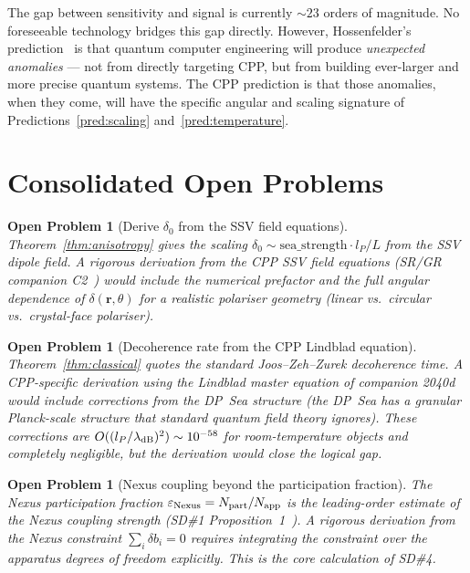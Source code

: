 \documentclass[11pt,a4paper]{article}
\newtheorem{openprob}[theorem]{Open Problem}
\newcommand{\lP}{l_P}
\newcommand{\eps}{\varepsilon}
\begin{document}
The gap between sensitivity and signal is currently $\sim 23$
orders of magnitude.  No foreseeable technology bridges this gap
directly.  However, Hossenfelder's prediction~\citep{hossenfelder2024}
is that quantum computer engineering will produce \emph{unexpected
anomalies} --- not from directly targeting CPP, but from building
ever-larger and more precise quantum systems.  The CPP prediction is
that those anomalies, when they come, will have the specific angular
and scaling signature of Predictions~\ref{pred:scaling}
and~\ref{pred:temperature}.

\section{Consolidated Open Problems}

\begin{openprob}[Derive $\delta_0$ from the SSV field equations]
\label{op:delta0}
Theorem~\ref{thm:anisotropy} gives the scaling $\delta_0 \sim
\text{sea\_strength} \cdot \lP/L$ from the SSV dipole field.
A rigorous derivation from the CPP SSV field equations (SR/GR
companion C2~\citep{abshier_sr}) would include the numerical
prefactor and the full angular dependence of
$\delta(\mathbf{r},\theta)$ for a realistic polariser geometry
(linear vs.\ circular vs.\ crystal-face polariser).
\end{openprob}

\begin{openprob}[Decoherence rate from the CPP Lindblad equation]
\label{op:decoherence_rate}
Theorem~\ref{thm:classical} quotes the standard
Joos--Zeh--Zurek decoherence time.  A CPP-specific derivation
using the Lindblad master equation of companion 2040d~\citep{cpp2040d}
would include corrections from the DP~Sea structure (the DP~Sea
has a granular Planck-scale structure that standard quantum
field theory ignores).  These corrections are $O((\lP/\lambda_{\rm
dB})^2) \sim 10^{-58}$ for room-temperature objects and completely
negligible, but the derivation would close the logical gap.
\end{openprob}

\begin{openprob}[Nexus coupling beyond the participation fraction]
\label{op:nexus_coupling}
The Nexus participation fraction $\eps_{\rm Nexus} = N_{\rm part}
/ N_{\rm app}$ is the leading-order estimate of the Nexus coupling
strength (SD\#1 Proposition~1~\citep{cpp_sd1}).  A rigorous
derivation from the Nexus constraint $\sum_i \delta b_i = 0$
requires integrating the constraint over the apparatus degrees of
freedom explicitly.  This is the core calculation of SD\#4.
\end{openprob}
\end{document}
